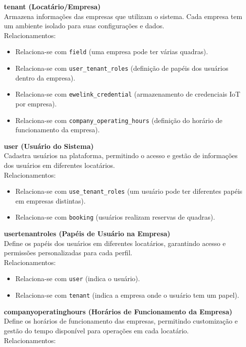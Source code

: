 \textbf{tenant (Locatário/Empresa)}\\
Armazena informações das empresas que utilizam o sistema. Cada empresa tem um ambiente isolado para suas configurações e dados.\\
Relacionamentos:
\begin{itemize}
	\item Relaciona-se com \texttt{field} (uma empresa pode ter várias quadras).
	\item Relaciona-se com \texttt{user\_tenant\_roles} (definição de papéis dos usuários dentro da empresa).
	\item Relaciona-se com \texttt{ewelink\_credential} (armazenamento de credenciais IoT por empresa).
	\item Relaciona-se com \texttt{company\_operating\_hours} (definição do horário de funcionamento da empresa).
\end{itemize}

\textbf{user (Usuário do Sistema)}\\
Cadastra usuários na plataforma, permitindo o acesso e gestão de informações dos usuários em diferentes locatários. \\
Relacionamentos: 
\begin{itemize} 
	\item Relaciona-se com \texttt{use\_tenant\_roles} (um usuário pode ter diferentes papéis em empresas distintas). 
	\item Relaciona-se com \texttt{booking} (usuários realizam reservas de quadras). 
\end{itemize}

\textbf{user\textunderscore tenant\textunderscore roles (Papéis de Usuário na Empresa)}\\
Define os papéis dos usuários em diferentes locatários, garantindo acesso e permissões personalizadas para cada perfil. \\
Relacionamentos: 

\begin{itemize} 
	\item Relaciona-se com \texttt{user} (indica o usuário). 
	\item Relaciona-se com \texttt{tenant} (indica a empresa onde o usuário tem um papel). 
\end{itemize}


\textbf{company\textunderscore operating\textunderscore hours (Horários de Funcionamento da Empresa)}\\
Define os horários de funcionamento das empresas, permitindo customização e gestão do tempo disponível para operações em cada locatário. \\
Relacionamentos: 

